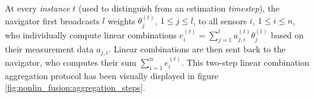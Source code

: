 At every \textit{instance} $t$ (used to distinguish from an estimation \textit{timestep}), the navigator first broadcasts $l$ weights $\theta_j^{(t)}$, $1\leq j\leq l$, to all sensors $i$, $1\leq i \leq n$, who individually compute linear combinations $e^{(t)}_i=\sum^l_{j=1}a_{j,i}^{(t)}\theta_j^{(t)}$ based on their measurement data $a_{j,i}$. Linear combinations are then sent back to the navigator, who computes their sum $\sum^n_{i=1}e^{(t)}_{i}$. This two-step linear combination aggregation protocol has been visually displayed in figure \ref{fig:nonlin_fusion:aggregation_steps}.
\begin{figure}[htbp]
\begin{subfigure}[htbp]{\textwidth}
    \centering
    \vspace{\baselineskip}
\end{subfigure}
\end{figure}
